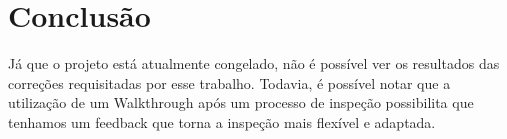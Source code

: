 \chapter{Conclusão}

Já que o projeto está atualmente congelado, não é possível ver os resultados das
correções requisitadas por esse trabalho. Todavia, é possível notar que a utilização
de um Walkthrough após um processo de inspeção possibilita que tenhamos um feedback
que torna a inspeção mais flexível e adaptada.
